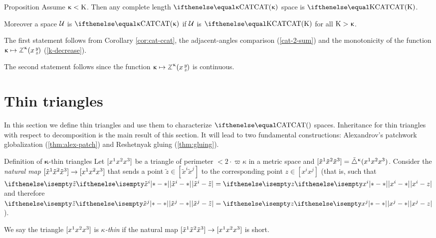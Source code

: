 \begin{thm}{Proposition}
\label{prop:inherit-bound}
Assume $\upkappa<\mathrm{K}$.
Then any complete length $\CAT\kappa$ space is $\CAT\Kappa$.

Moreover a space $\mathcal{U}$ is $\CAT\kappa$ if  $\mathcal{U}$ is $\CAT\Kappa$ for all $\mathrm{K}>\upkappa$.
\end{thm}

The first statement follows from Corollary \ref{cor:cat-ccat}, the adjacent-angles comparison (\ref{cat-2-sum}) and the monotonicity of the function $\kappa\mapsto\angk\kappa x y z$ (\ref{k-decrease}).

The second statement follows since the function $\kappa\mapsto\angk\kappa x y z$ is continuous.
\qeds


\section{Thin triangles} \label{sec:thin-triangle}

In this section we define thin triangles
and use them to characterize $\CAT{}$ spaces.
Inheritance for thin triangles with respect to decomposition
is the main result of this section.
It will lead to two fundamental constructions:  
Alexandrov's patchwork globalization  (\ref{thm:alex-patch}) 
and Reshetnyak gluing (\ref{thm:gluing}).
 
\begin{thm}{Definition of $\bm\kappa$-thin triangles}\label{def:k-thin}
Let $[{x^1}{x^2}{x^3}]$ be a triangle of perimeter $<2\cdot \varpi\kappa$ in a metric space
and
$\trig{\tilde x^1}{\tilde x^2}{\tilde x^3}\z=\modtrig\kappa({x^1}{x^2}{x^3})$.
Consider the \emph{natural map} $\trig{\tilde x^1}{\tilde x^2}{\tilde x^3}\to \trig{x^1}{x^2}{x^3}$ 
that sends a point $\tilde z\in[\tilde x^i\tilde x^j]$ to the corresponding point $z\in[x^ix^j]$
(that is, such that $\dist{\tilde x^i}{\tilde z}{}=\dist{x^i}{z}{}$ and therefore $\dist{\tilde x^j}{\tilde z}{}=\dist{x^j}{z}{}$).

We say the triangle $[{x^1}{x^2}{x^3}]$ is \emph{$\kappa$-thin} if the natural map $\trig{\tilde x^1}{\tilde x^2}{\tilde x^3}\to \trig{x^1}{x^2}{x^3}$ is short.
\end{thm}

